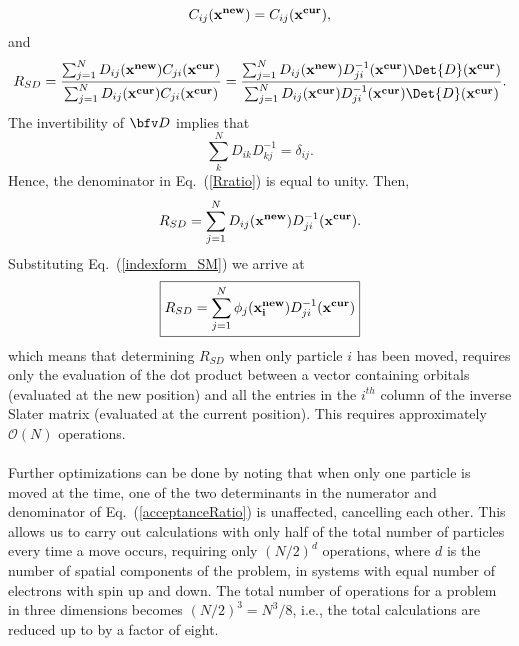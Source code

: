 $$C_{ij}({\bf x^{new}}) = C_{ij}({\bf x^{cur}}),$$
and 
\begin{equation}\label{Rratio}
R_{SD} = \frac{\sum_{j=1}^{N}D_{ij}({\bf x^{new}}) C_{ji}({\bf x^{cur}})}{\sum_{j=1}^{N}D_{ij}({\bf x^{cur}}) C_{ji}({\bf x^{cur}})} =  \frac{\sum_{j=1}^{N}D_{ij}({\bf x^{new}}) D_{ji}^{-1}({\bf x^{cur}}) \Det{D}({\bf x^{cur}})}{\sum_{j=1}^{N}D_{ij}({\bf x^{cur}}) D_{ji}^{-1}({\bf x^{cur}}) \Det{D}({\bf x^{cur}})}.\end{equation}
The invertibility of $\bfv D$ implies that 
\begin{equation}\label{inverseSlaterMatrix}
 \sum_{k}^{N} D_{ik} D^{-1}_{kj} = \delta_{ij}.
\end{equation}
Hence, the denominator in Eq.~(\ref{Rratio}) is equal to unity. Then, $$
R_{SD} = \sum_{j=1}^{N}D_{ij}({\bf x^{new}}) D_{ji}^{-1}({\bf x^{cur}}).
$$
Substituting Eq.~(\ref{indexform_SM}) we arrive at
\begin{equation}\label{RSD}
 \boxed{R_{SD} = \sum_{j=1}^{N} \phi_j({\bf x^{new}_i}) D_{ji}^{-1}({\bf x^{cur}})}
\end{equation}
which means that determining $R_{SD}$ when only particle $i$ has been moved, requires only the evaluation of the dot product between a vector containing orbitals (evaluated at the new position) and all the entries in the $i^{th}$ column of the inverse Slater matrix (evaluated at the current position). This requires approximately $\mathcal{O}(N)$ operations.\\
\\
\noindent
Further optimizations can be done by noting that when only one particle is moved at the time, one of the two determinants in the numerator and denominator of 
Eq.~(\ref{acceptanceRatio}) is unaffected, cancelling each other. This allows us to 
carry out calculations with only half of the total number of particles every time a move occurs, requiring only $(N/2)^d$ o\-pe\-ra\-tions, where $d$ is the number of spatial components of the problem, in systems with equal number of electrons with spin up and down. The total number of operations for a problem in three dimensions becomes $(N/2)^3 = N^3/8$, i.e., the total calculations are reduced up to by a factor of eight.


